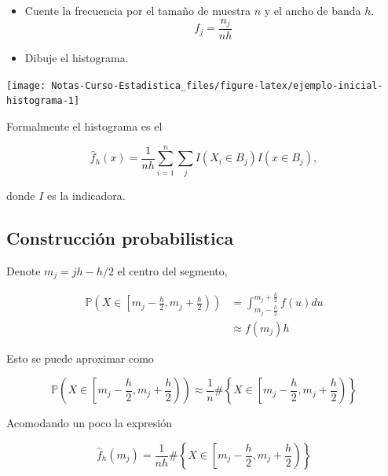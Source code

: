 \documentclass[
  12pt,
]{book}
\theoremstyle{definition}
\theoremstyle{definition}
\theoremstyle{definition}
\theoremstyle{remark}
\begin{document}
\begin{itemize}
\item
  Cuente la frecuencia por el tamaño de muestra \(n\) y el ancho de banda \(h\).
  \begin{equation*}
  f_j = \frac{n_j}{nh}
  \end{equation*}
\item
  Dibuje el histograma.
\end{itemize}

\begin{center}\texttt{[image: Notas-Curso-Estadistica\_files/figure-latex/ejemplo-inicial-histograma-1]} \end{center}

Formalmente el histograma es el

\begin{equation*}
\hat{f}_h(x) = \frac{1}{nh} \sum_{i = 1}^{n} \sum_{j} I(X_i\in B_j) I(x\in B_j),
\end{equation*}

donde \(I\) es la indicadora.

\hypertarget{construcciuxf3n-probabilistica}{%
\subsection{Construcción probabilistica}\label{construcciuxf3n-probabilistica}}

Denote \(m_j=jh-h/2\) el centro del segmento,

\begin{align*}
    \mathbb{P}\left(X\in \left[m_j - \frac{h}{2},m_j + \frac{h}{2} \right)\right)
      & =
    \int_{m_j - \frac{h}{2}}^{m_j + \frac{h}{2}} f(u)du                                             \\
      & \approx f(m_j)h
\end{align*}

Esto se puede aproximar como

\begin{equation*}
    \mathbb{P} \left(X\in \left[m_j - \frac{h}{2},m_j + \frac{h}{2}\right) \right)  \approx   \frac{1}{n} \#
    \left\{X\in \left[m_j - \frac{h}{2},m_j + \frac{h}{2}\right) \right\}
\end{equation*}

Acomodando un poco la expresión

\begin{equation*}
\hat{f}_h(m_j) =  \frac{1}{nh} \#
\left\{X\in \left[m_j - \frac{h}{2},m_j + \frac{h}{2}\right) \right\}
\end{equation*}
\end{document}
